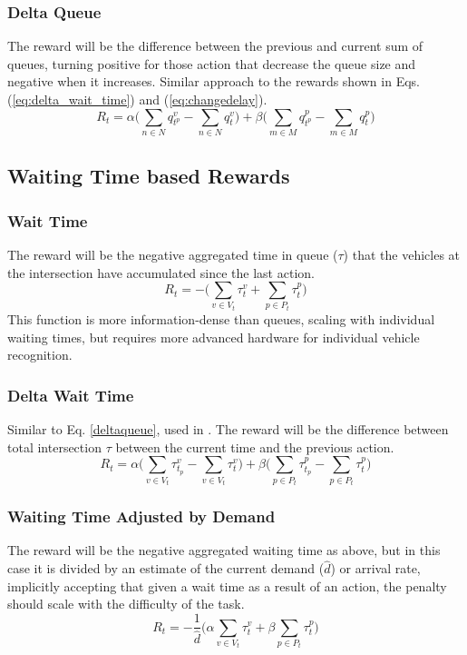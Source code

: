 \documentclass[conference]{IEEEtran}
\begin{document}
\subsubsection{Delta Queue}
The reward will be the difference between the previous and current sum of queues, turning positive for those action that decrease the queue size and negative when it increases.
Similar approach to the rewards shown in Eqs. (\ref{eq:delta_wait_time}) and (\ref{eq:changedelay}).
\begin{equation}
    R_t = \alpha \bigg( \sum_{n \in N} q^v_{t^p} -\sum_{n \in N} q^v_{t} \bigg) + \beta \bigg( \sum_{m \in M} q^p_{t^p} - \sum_{m \in M} q^p_{t} \bigg)
    \label{deltaqueue}
\end{equation}

\subsection{Waiting Time based Rewards}
\subsubsection{Wait Time}
The reward will be the negative aggregated time in queue ($\tau$) that the vehicles at the intersection have accumulated since the last action. 
\begin{equation}
R_t = - \bigg( \sum_{v \in V_t} \tau^v_{t} + \sum_{p \in P_t} \tau^p_{t} \bigg)
\label{eq:wait_time}
\end{equation}
This function is more information-dense than queues, scaling with individual waiting times, but requires more advanced hardware for individual vehicle recognition.

\subsubsection{Delta Wait Time}
Similar to Eq. \ref{deltaqueue}, used in \cite{liang2018}. The reward will be the difference between total intersection $\tau$ between the current time and the previous action. 
\begin{equation}
R_t = \alpha \bigg( \sum_{v \in V_t} \tau^v_{t_p} -  \sum_{v \in V_t} \tau^v_{t} \bigg) + \beta \bigg( \sum_{p \in P_t} \tau^p_{t_p} -  \sum_{p \in P_t} \tau^p_{t} \bigg)
\label{eq:delta_wait_time}
\end{equation}

\subsubsection{Waiting Time Adjusted by Demand}
The reward will be the negative aggregated waiting time as above, but in this case it is divided by an estimate of the current demand ($\hat{d}$) or arrival rate, implicitly accepting that given a wait time as a result of an action, the penalty should scale with the difficulty of the task.
\begin{equation}
   R_t = -\frac{1}{\hat{d}} \bigg( \alpha \sum_{v \in V_t} \tau^v_{t} + \beta \sum_{p \in P_t} \tau^p_{t} \bigg)
\label{eq:wait_time_norm} 
\end{equation}
\end{document}
